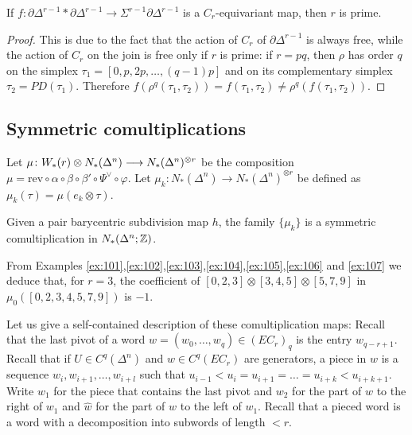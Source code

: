 \begin{lemma}
    If $f\colon \partial \Delta^{r-1}*\partial\Delta^{r-1}\to \Sigma^{r-1}\partial \Delta^{r-1}$ is a $C_r$-equivariant map, then $r$ is prime.
\end{lemma}
\begin{proof}
    This is due to the fact that the action of $C_r$ of $\partial \Delta^{r-1}$ is always free, while the action of $C_r$ on the join is free only if $r$ is prime: if $r=pq$, then $\rho$ has order $q$ on the simplex $\tau_1 = [0,p,2p,\ldots,(q-1)p]$ and on its complementary simplex $\tau_2 = PD(\tau_1)$. Therefore $f(\rho^q(\tau_1,\tau_2)) = f(\tau_1,\tau_2)\neq \rho^q(f(\tau_1,\tau_2))$.
\end{proof}
\subsection{Symmetric comultiplications} Let $\mu\colon W_*(r)\otimes N_*(\Delta^n)\longrightarrow N_*(\Delta^n)^{\otimes r}$ be the composition $\mu = \mathrm{rev}\circ\alpha\circ\beta\circ\beta'\circ\Psi^{\vee}\circ\varphi$. Let $\mu_k\colon N_*(\Delta^n)\to N_*(\Delta^n)^{\otimes r}$ be defined as $\mu_k(\tau) = \mu(e_k\otimes \tau)$.
\begin{theorem} Given a pair barycentric subdivision map $h$, the family $\{\mu_k\}$ is a symmetric comultiplication in $N_*(\Delta^n;\mathbb{Z})$.
\end{theorem}
\begin{example}
    From Examples \ref{ex:101},\ref{ex:102},\ref{ex:103},\ref{ex:104},\ref{ex:105},\ref{ex:106} and \ref{ex:107} we deduce that, for $r=3$, the coefficient of $[0,2,3]\otimes [3,4,5]\otimes [5,7,9]$ in $\mu_0([0,2,3,4,5,7,9])$ is $-1$.
\end{example}
Let us give a self-contained description of these comultiplication maps: Recall that the last pivot of a word $w = (w_0,\ldots,w_q)\in (EC_r)_q$ is the entry $w_{q-r+1}$. Recall that if $U\in C^q(\Delta^n)$ and $w\in C^q(EC_r)$ are generators, a piece in $w$ is a sequence $w_i,w_{i+1},\ldots,w_{i+l}$ such that $u_{i-1}<u_i = u_{i+1} = \ldots = u_{i+k} < u_{i+k+1}$. Write $w_1$ for the piece that contains the last pivot and $w_2$ for the part of $w$ to the right of $w_1$ and $\hat{w}$ for the part of $w$ to the left of $w_1$. Recall that a pieced word is a word with a decomposition into subwords of length $<r$.

